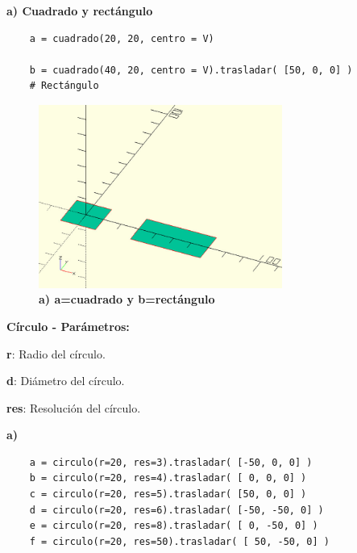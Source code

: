 \textbf{a) Cuadrado y rectángulo} 

\begin{listing}[ht]
\begin{verbatim}
    a = cuadrado(20, 20, centro = V)
    
    b = cuadrado(40, 20, centro = V).trasladar( [50, 0, 0] ) 
    # Rectángulo
\end{verbatim}
\end{listing}

\begin{figure}[h]
\includegraphics[width=8cm]{Img/Modelos/modelado17.jpg}
\centering
\caption{\textbf{ \footnotesize{a) a=cuadrado y b=rectángulo}}}
\end{figure}

\clearpage
\begin{description}
\item \textbf{Círculo - Parámetros:}
\item  \textbf{r}: Radio del círculo.
\item  \textbf{d}: Diámetro del círculo.
\item  \textbf{res}: Resolución del círculo.
\end{description}

\textbf{a)} 
\begin{listing}[ht]
\begin{verbatim}
    a = circulo(r=20, res=3).trasladar( [-50, 0, 0] )
    b = circulo(r=20, res=4).trasladar( [ 0, 0, 0] )
    c = circulo(r=20, res=5).trasladar( [50, 0, 0] )
    d = circulo(r=20, res=6).trasladar( [-50, -50, 0] )
    e = circulo(r=20, res=8).trasladar( [ 0, -50, 0] )
    f = circulo(r=20, res=50).trasladar( [ 50, -50, 0] )
\end{verbatim}
\end{listing}

